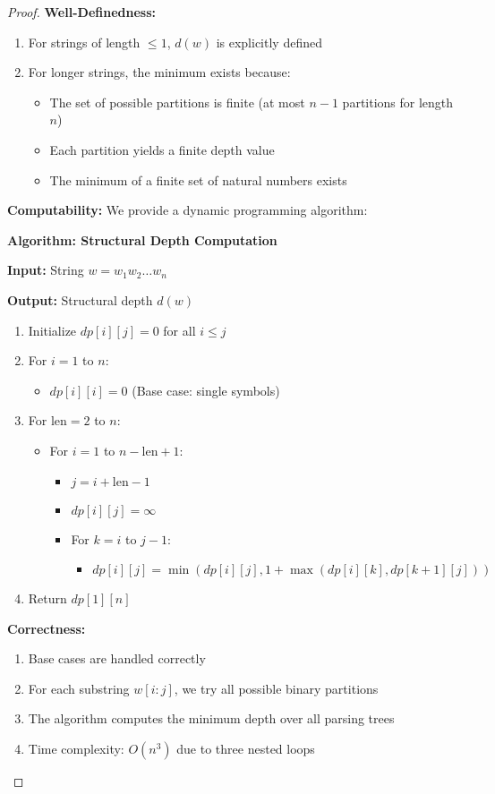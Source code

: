 \documentclass[11pt]{article}
\theoremstyle{plain}
\theoremstyle{definition}
\begin{document}
\begin{proof}
\textbf{Well-Definedness:}
\begin{enumerate}
\item For strings of length $\leq 1$, $d(w)$ is explicitly defined
\item For longer strings, the minimum exists because:
  \begin{itemize}
  \item The set of possible partitions is finite (at most $n-1$ partitions for length $n$)
  \item Each partition yields a finite depth value
  \item The minimum of a finite set of natural numbers exists
  \end{itemize}
\end{enumerate}

\textbf{Computability:}
We provide a dynamic programming algorithm:

\textbf{Algorithm: Structural Depth Computation}

\textbf{Input:} String $w = w_1w_2\ldots w_n$

\textbf{Output:} Structural depth $d(w)$

\begin{enumerate}
\item Initialize $dp[i][j] = 0$ for all $i \leq j$
\item For $i = 1$ to $n$:
   \begin{itemize}
   \item $dp[i][i] = 0$ (Base case: single symbols)
   \end{itemize}
\item For $\text{len} = 2$ to $n$:
   \begin{itemize}
   \item For $i = 1$ to $n-\text{len}+1$:
      \begin{itemize}
      \item $j = i + \text{len} - 1$
      \item $dp[i][j] = \infty$
      \item For $k = i$ to $j-1$:
         \begin{itemize}
         \item $dp[i][j] = \min(dp[i][j], 1 + \max(dp[i][k], dp[k+1][j]))$
         \end{itemize}
      \end{itemize}
   \end{itemize}
\item Return $dp[1][n]$
\end{enumerate}

\textbf{Correctness:}
\begin{enumerate}
\item Base cases are handled correctly
\item For each substring $w[i:j]$, we try all possible binary partitions
\item The algorithm computes the minimum depth over all parsing trees
\item Time complexity: $O(n^3)$ due to three nested loops
\end{enumerate}
\end{proof}
\end{document}

